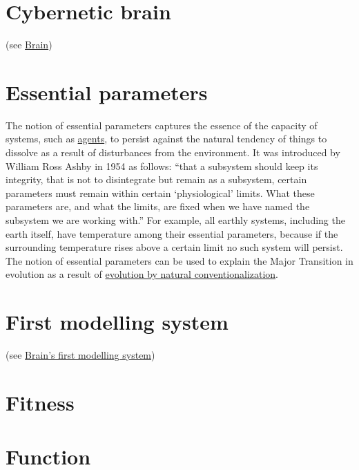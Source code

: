 \documentclass[12pt]{article}
\begin{document}
\hypertarget{cybernetic_brain}{}
\section{Cybernetic brain} (see \hyperlink{brain}{Brain})


\hypertarget{essential_parameters}{}
\section{Essential parameters}
The notion of essential parameters captures the essence of the
capacity of systems, such as \hyperlink{agent}{agents}, to persist
against the natural tendency of things to dissolve as a result of
disturbances from the environment. It was introduced by William Ross
Ashby in 1954 as follows: ``that a subsystem should keep its
integrity, that is not to disintegrate but remain as a subsystem,
certain parameters must remain within certain `physiological'
limits. What these parameters are, and what the limits, are fixed when
we have named the subsystem we are working with.'' For example, all
earthly systems, including the earth itself, have temperature among
their essential parameters, because if the surrounding temperature
rises above a certain limit no such system will persist. The notion of
essential parameters can be used to explain the Major Transition in
evolution as a result of
\hyperlink{natural_conventionalization}{evolution by natural
  conventionalization}.

\hypertarget{first_modelling_system}{}
\section{First modelling system} (see \hyperlink{brains_first_modelling_system}{Brain's first modelling system})

\hypertarget{fitness}{}
\section{Fitness}

\hypertarget{function}{}
\section{Function}
\end{document}
